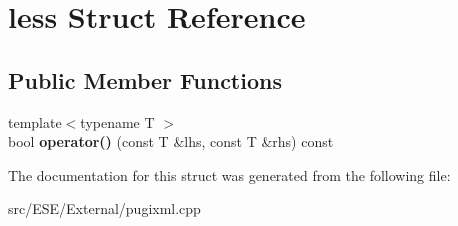 \hypertarget{structless}{\section{less Struct Reference}
\label{structless}
}
\subsection*{Public Member Functions}
\begin{DoxyCompactItemize}
\item 
\hypertarget{structless_ad467675b44baab18215475c7cba0cb48}{{\footnotesize template$<$typename T $>$ }\\bool {\bfseries operator()} (const T \&lhs, const T \&rhs) const }\label{structless_ad467675b44baab18215475c7cba0cb48}

\end{DoxyCompactItemize}


The documentation for this struct was generated from the following file\-:\begin{DoxyCompactItemize}
\item 
src/\-E\-S\-E/\-External/pugixml.\-cpp\end{DoxyCompactItemize}
